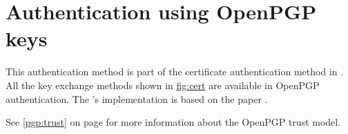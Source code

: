 \section{Authentication using OpenPGP keys}
\label{sec:pgp}

This authentication method is part of the certificate authentication
method in \gnutls{}. All the key exchange methods shown in \hyperref{figure}{figure }{}{fig:cert} are
available in OpenPGP authentication. The \gnutls{}'s implementation is based on the
paper \cite{TLSPGP}.

See \ref{pgp:trust} on page \pageref{pgp:trust} for more information 
about the OpenPGP trust model.
